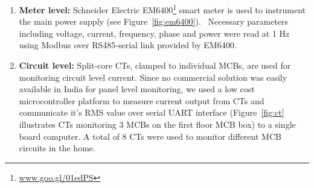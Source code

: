 \documentclass[10pt]{sensys-proc}
\newcommand{\figref}[1]{Figure~\ref{#1}}
\newcommand{\denselistbib}{
  \itemsep -.6pt\topsep-4pt\partopsep-20pt
}
\begin{document}
\begin{enumerate}[leftmargin=1em]\denselistbib
\vspace{-1.5mm}\item \textbf{Meter level:} Schneider Electric EM6400\footnote{\url{www.goo.gl/01edPS}} smart meter is used to instrument the main power supply (see \figref{fig:em6400}).%
~Necessary parameters including voltage, current, frequency, phase and power were read at 1 Hz using Modbus over RS485-serial link provided by EM6400. 

\vspace{-1.5mm} \item \textbf{Circuit level:} Split-core CTs, clamped to individual MCBs, are used for monitoring circuit level current. Since no commercial solution was easily available in India for panel level monitoring, we used a low cost microcontroller platform to measure current output from CTs and communicate it's RMS value over serial UART interface (\figref{fig:ct} illustrates CTs monitoring 3 MCBs on the first floor MCB box) to a single board computer. A total of 8 CTs were used to monitor different MCB circuits in the home.


\end{enumerate}
\end{document}
